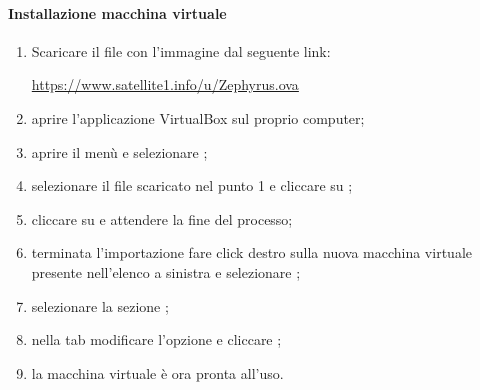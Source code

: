 	\paragraph{Installazione macchina virtuale} \label{installazioneMacchinaVirtuale}
	\begin{enumerate}
		\item Scaricare il file con l'immagine dal seguente link:
		\begin{center}
			\url{https://www.satellite1.info/u/Zephyrus.ova}
		\end{center}
		\item aprire l'applicazione VirtualBox sul proprio computer;
		\item aprire il menù  e selezionare ;
		\item selezionare il file  scaricato nel punto 1 e cliccare su ;
		\item cliccare su  e attendere la fine del processo;
		\item terminata l'importazione fare click destro sulla nuova macchina virtuale presente nell'elenco a sinistra e selezionare ;
		\item selezionare la sezione ;
		\item nella tab  modificare l'opzione  e cliccare ;
		\item la macchina virtuale è ora pronta all'uso.
	\end{enumerate}
